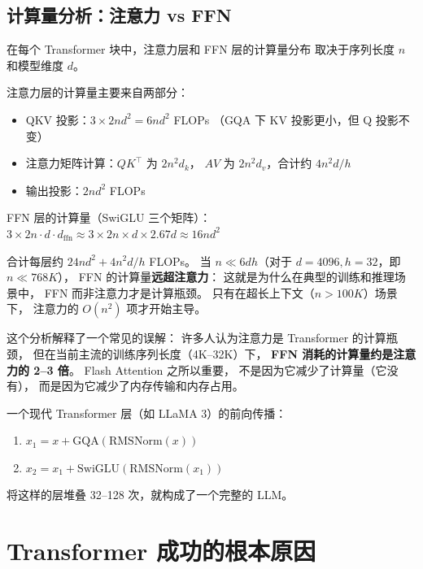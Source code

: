 \subsection{计算量分析：注意力 vs FFN}

在每个 Transformer 块中，注意力层和 FFN 层的计算量分布
取决于序列长度 $n$ 和模型维度 $d$。

注意力层的计算量主要来自两部分：
\begin{itemize}[noitemsep]
  \item QKV 投影：$3 \times 2nd^2 = 6nd^2$ FLOPs
        （GQA 下 KV 投影更小，但 Q 投影不变）
  \item 注意力矩阵计算：$QK^\top$ 为 $2n^2 d_k$，
        $AV$ 为 $2n^2 d_v$，合计约 $4n^2 d/h$
  \item 输出投影：$2nd^2$ FLOPs
\end{itemize}

FFN 层的计算量（SwiGLU 三个矩阵）：
$3 \times 2n \cdot d \cdot d_{\mathrm{ffn}} \approx 3 \times 2n \times d \times 2.67d \approx 16nd^2$

合计每层约 $24nd^2 + 4n^2 d/h$ FLOPs。
当 $n \ll 6dh$（对于 $d = 4096, h = 32$，即 $n \ll 768K$），
FFN 的计算量\textbf{远超注意力}：
这就是为什么在典型的训练和推理场景中，
FFN 而非注意力才是计算瓶颈。
只有在超长上下文（$n > 100K$）场景下，
注意力的 $O(n^2)$ 项才开始主导。

这个分析解释了一个常见的误解：
许多人认为注意力是 Transformer 的计算瓶颈，
但在当前主流的训练序列长度（4K--32K）下，
\textbf{FFN 消耗的计算量约是注意力的 2--3 倍}。
Flash Attention 之所以重要，
不是因为它减少了计算量（它没有），
而是因为它减少了内存传输和内存占用。

\begin{keybox}
一个现代 Transformer 层（如 LLaMA 3）的前向传播：
\begin{enumerate}[noitemsep]
  \item $x_1 = x + \mathrm{GQA}(\mathrm{RMSNorm}(x))$
  \item $x_2 = x_1 + \mathrm{SwiGLU}(\mathrm{RMSNorm}(x_1))$
\end{enumerate}
将这样的层堆叠 32--128 次，就构成了一个完整的 LLM。
\end{keybox}

\section{Transformer 成功的根本原因}

